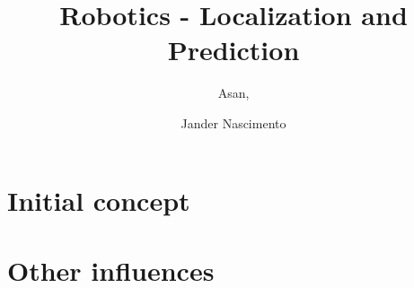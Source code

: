 \documentclass{article}
\begin{document}
\title{Robotics - Localization and Prediction}

\author{Asan, 
\and Jander Nascimento}

\maketitle

\section{Initial concept}

\section{Other influences}
\end{document}
